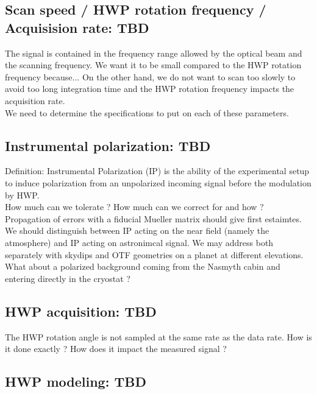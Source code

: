\documentclass[a4paper]{article}
\begin{document}
\subsection{Scan speed / HWP rotation frequency / Acquisision rate: TBD}

The signal is contained in the frequency range allowed by the optical beam and
the scanning frequency. We want it to be small compared to the HWP rotation
frequency because... On the other hand, we do not want to scan too slowly to
avoid too long integration time and the HWP rotation frequency impacts the
acquisition rate.\\

We need to determine the specifications to put on each of these parameters.


\subsection{Instrumental polarization: TBD}

Definition: Instrumental Polarization (IP) is the ability of the experimental setup to induce
polarization from an unpolarized incoming signal before the modulation by HWP.\\

How much can we tolerate ? How much can we correct for and how ? Propagation of
errors with a fiducial Mueller matrix should give first estaimtes.\\

We should distinguish between IP acting on the near field (namely the
atmosphere) and IP acting on astronimcal signal. We may address both separately
with skydips and OTF geometries on a planet at different elevations.\\

What about a polarized background coming from the Nasmyth cabin and entering
directly in the cryostat ?

\subsection{HWP acquisition: TBD}

The HWP rotation angle is not sampled at the same rate as the data rate. How is
it done exactly ? How does it impact the measured signal ?

\subsection{HWP modeling: TBD}
\end{document}
